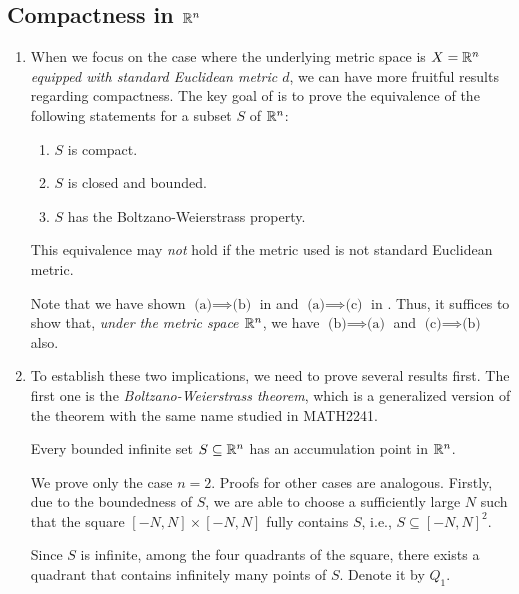 \subsection{Compactness in \(\mathbb{R}^n\)}
\label{subsect:compactness-rn}
\begin{enumerate}
\item When we focus on the case where the underlying metric space is \(X=\mathbb{R}^n\)
\emph{equipped with standard Euclidean metric \(d\)}, we can have more fruitful
results regarding compactness. The key goal of  is
to prove the equivalence of the following statements for a subset \(S\) of
\(\mathbb{R}^n\):
\begin{enumerate}
\item \(S\) is compact.
\item \(S\) is closed and bounded.
\item \(S\) has the Boltzano-Weierstrass property.
\end{enumerate}
\begin{warning}
This equivalence may \emph{not} hold if the metric used is not standard
Euclidean metric.
\end{warning}

Note that we have shown \(\text{(a)}\implies \text{(b)}\) in
 and \(\text{(a)}\implies \text{(c)}\) in
. Thus, it suffices to show that, \emph{under the metric
space \(\mathbb{R}^n\)}, we have \(\text{(b)}\implies \text{(a)}\) and
\(\text{(c)}\implies \text{(b)}\) also.

\item To establish these two implications, we need to prove several results
first. The first one is the \emph{Boltzano-Weierstrass theorem}, which is a
generalized version of the theorem with the same name studied in MATH2241.

\begin{theorem}
\label{thm:boltzano-weierstrass}
Every bounded infinite set \(S\subseteq \mathbb{R}^n\) has an accumulation point in
\(\mathbb{R}^n\).
\end{theorem}
\begin{pf}
We prove only the case \(n=2\). Proofs for other cases are analogous. Firstly,
due to the boundedness of \(S\), we are able to choose a sufficiently large
\(N\) such that the square \([-N,N]\times [-N,N]\) fully contains \(S\), i.e.,
\(S\subseteq [-N,N]^{2}\).
\begin{center}
\end{center}
Since \(S\) is infinite, among the four quadrants of the square, there exists
a quadrant that contains infinitely many points of \(S\). Denote it by \(Q_1\).


\end{pf}
\end{enumerate}
